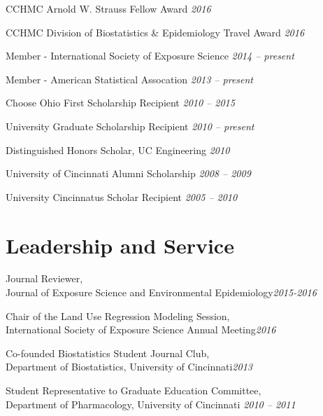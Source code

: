 \documentclass[margin,line]{res}
\newenvironment{list3}{
  \begin{list}{}{%
      \setlength{\itemsep}{0in}
      \setlength{\parsep}{0in} \setlength{\parskip}{0in}
      \setlength{\topsep}{0in} \setlength{\partopsep}{0in} 
      \setlength{\leftmargin}{0in}}}{\end{list}}
\begin{document}
\begin{resume}
\begin{list3} \itemsep 4pt   
\item[] CCHMC Arnold W. Strauss Fellow Award \hfill \textit{2016}
\item[] CCHMC Division of Biostatistics \& Epidemiology Travel Award \hfill \textit{2016}
\item[] Member - International Society of Exposure Science \hfill \textit{2014 -- present}
\item[] Member - American Statistical Assocation \hfill \textit{2013 -- present}
\item[] Choose Ohio First Scholarship Recipient \hfill \textit{2010 -- 2015}
\item[] University Graduate Scholarship Recipient \hfill \textit{2010 -- present}
\item[] Distinguished Honors Scholar, UC Engineering \hfill \textit{2010}
\item[] University of Cincinnati Alumni Scholarship \hfill \textit{2008 -- 2009}
\item[] University Cincinnatus Scholar Recipient \hfill \textit{2005 -- 2010}
\end{list3}


\section{\sc Leadership and Service} 
\begin{list3} \itemsep 4pt     
\item[] Journal Reviewer, \\Journal of Exposure Science and Environmental Epidemiology\hfill \textit{2015-2016} 
\item[] Chair of the Land Use Regression Modeling Session, \\International Society of Exposure Science Annual Meeting\hfill \textit{2016} 
\item[] Co-founded Biostatistics Student Journal Club, \\Department of Biostatistics, University of Cincinnati\hfill \textit{2013} 
\item[] Student Representative to Graduate Education Committee, \\Department of Pharmacology, University of Cincinnati \hfill \textit{2010 -- 2011}
\end{list3}


\end{resume}
\end{document}

